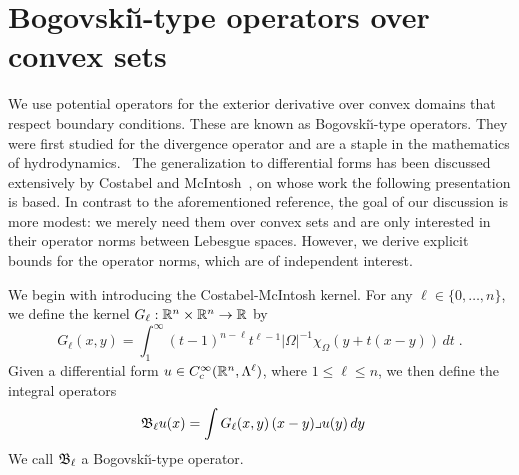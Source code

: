 \documentclass[a4paper]{article}
\begin{document}
\section{Bogovski\u{\i}-type operators over convex sets}\label{section:bogovskii}

We use potential operators for the exterior derivative over convex domains that respect boundary conditions. 
These are known as Bogovski\u{\i}-type operators.
They were first studied for the divergence operator and are a staple in the mathematics of hydrodynamics.~\cite{bogovskii1979solution} 
The generalization to differential forms has been discussed extensively by Costabel and McIntosh~\cite{costabel2010bogovskiui},
on whose work the following presentation is based. 
In contrast to the aforementioned reference, the goal of our discussion is more modest:
we merely need them over convex sets and are only interested in their operator norms between Lebesgue spaces.
However, we derive explicit bounds for the operator norms, which are of independent interest. 


We begin with introducing the Costabel-McIntosh kernel.
For any $\ell \in \{0,\dotsc,n\}$, we define the kernel $G_{\ell} : {\mathbb R}^{n} \times {\mathbb R}^{n} \rightarrow {\mathbb R}$ by
\begin{equation}\label{eq:Gl}
  G_{\ell}(x,y) = \int_{1}^\infty (t-1)^{n-\ell}t^{\ell-1} |\Omega|^{-1}\chi_{\Omega} \left(y+t(x-y)\right)\,dt \;.
\end{equation}
Given a differential form $u \in {C^\infty_c}({\mathbb R}^n,\Lambda^\ell)$, where \(1 \leq \ell \leq n\), 
we then define the integral operators
\begin{align}
  {\mathfrak B}_{\ell} u(x) &= \int G_{\ell}(x,y) \,(x-y)\lrcorner u(y)\,dy
\end{align}
We call ${\mathfrak B}_{\ell}$ a Bogovski\u{\i}-type operator. 
\end{document}
